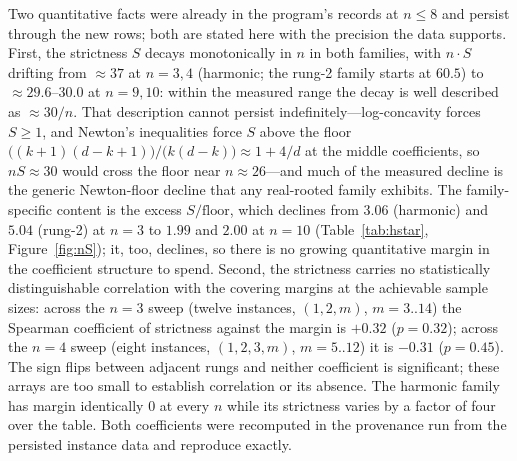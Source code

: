 \documentclass[11pt,a4paper]{article}
\numberwithin{equation}{section}
\theoremstyle{plain}
\theoremstyle{definition}
\theoremstyle{remark}
\begin{document}
Two quantitative facts were already in the program's records at $n\le8$
and persist through the new rows; both are stated here with the precision
the data supports. First, the strictness $S$ decays monotonically in $n$
in both families, with $n\cdot S$ drifting from $\approx37$ at
$n=3,4$ (harmonic; the rung-2 family starts at $60.5$) to
$\approx29.6$--$30.0$ at $n=9,10$: within the measured range the decay
is well described as $\approx30/n$. That description cannot persist
indefinitely---log-concavity forces $S\ge1$, and Newton's inequalities
force $S$ above the floor $\bigl((k{+}1)(d{-}k{+}1)\bigr)/\bigl(k(d{-}k)
\bigr)\approx1+4/d$ at the middle coefficients, so $nS\approx30$ would
cross the floor near $n\approx26$---and much of the measured decline is
the generic Newton-floor decline that any real-rooted family exhibits.
The family-specific content is the excess $S/\text{floor}$, which declines
from $3.06$ (harmonic) and $5.04$ (rung-2) at $n=3$ to $1.99$ and
$2.00$ at $n=10$ (Table~\ref{tab:hstar}, Figure~\ref{fig:nS}); it, too,
declines, so there is no growing quantitative margin in the coefficient
structure to spend. Second, the strictness carries no statistically
distinguishable correlation with the covering margins at the achievable
sample sizes: across the $n=3$ sweep (twelve instances, $(1,2,m)$,
$m=3..14$) the Spearman coefficient of strictness against the margin is
$+0.32$ ($p=0.32$); across the $n=4$ sweep (eight instances,
$(1,2,3,m)$, $m=5..12$) it is $-0.31$ ($p=0.45$). The sign flips
between adjacent rungs and neither coefficient is significant; these
arrays are too small to establish correlation or its absence. The
harmonic family has margin identically $0$ at every $n$ while its
strictness varies by a factor of four over the table. Both coefficients
were recomputed in the provenance run from the persisted instance data
and reproduce exactly.
\end{document}
